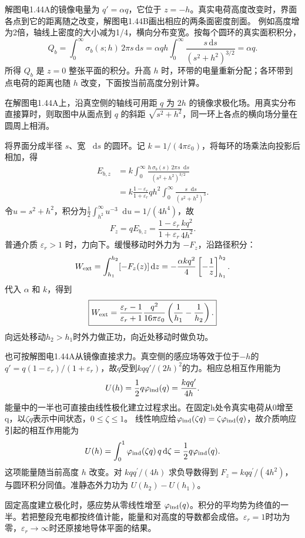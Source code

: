 \documentclass[UTF8,fontset=fandol,a4paper,11pt]{ctexart}
\newcommand{\dd}{\mathop{}\!\mathrm{d}}
\newcommand{\result}[1]{\begin{equation*}\boxed{#1}\end{equation*}}
\begin{document}
解图电1.44A的镜像电量为 $q'=\alpha q$，它位于 $z=-h$。真实电荷高度改变时，界面各点到它的距离随之改变，解图电1.44B画出相应的两条面密度剖面。
例如高度增为2倍，轴线上密度的大小减为1/4，横向分布变宽。按每个圆环的真实面积积分，
\[
Q_b=\int_0^\infty \sigma_b(s;h)\,2\pi s\,\mathrm ds
=\alpha qh\int_0^\infty\frac{s\,\mathrm ds}{(s^2+h^2)^{3/2}}
=\alpha q.
\]
所得 $Q_b$ 是 $z=0$ 整张平面的积分。升高 $h$ 时，环带的电量重新分配；各环带到点电荷的距离也随 $h$ 改变，下面按当前高度分别计算。

在解图电1.44A上，沿真空侧的轴线可用距 $q$ 为 $2h$ 的镜像求极化场。用真实分布直接算时，则取图中从面点到 $q$ 的斜距 $\sqrt{s^2+h^2}$，同一环上各点的横向场分量在圆周上相消。

将界面分成半径 $s$、宽 $\dd s$ 的圆环。记 $k=1/(4\pi\varepsilon_0)$，将每环的场乘法向投影后相加，得
\begin{align*}
E_{b,z}&=k\int_0^\infty\frac{h\,\sigma_b(s)\,2\pi s\dd s}{(s^2+h^2)^{3/2}}\\
&=k\frac{1-\varepsilon_r}{1+\varepsilon_r}qh^2
\int_0^\infty\frac{s\dd s}{(s^2+h^2)^3}.
\end{align*}
令$u=s^2+h^2$，积分为$\frac12\int_{h^2}^\infty u^{-3}\dd u=1/(4h^4)$，故
\[F_z=qE_{b,z}=\frac{1-\varepsilon_r}{1+\varepsilon_r}\frac{kq^2}{4h^2}.
\]
普通介质 $\varepsilon_r>1$ 时，力向下。缓慢移动时外力为 $-F_z$，沿路径积分：
\[
W_{\rm ext}=\int_{h_1}^{h_2}[-F_z(z)]\,\mathrm dz
=-\frac{\alpha kq^2}{4}\left[-\frac{1}{z}\right]_{h_1}^{h_2}.
\]
代入 $\alpha$ 和 $k$，得到
\result{W_{\rm ext}=\frac{\varepsilon_r-1}{\varepsilon_r+1}\frac{q^2}{16\pi\varepsilon_0}
\left(\frac1{h_1}-\frac1{h_2}\right).}
向远处移动$h_2>h_1$时外力做正功，向近处移动时做负功。

也可按解图电1.44A从镜像直接求力。真空侧的感应场等效于位于$-h$的$q'=q(1-\varepsilon_r)/(1+\varepsilon_r)$，故$q$受到$kqq'/(2h)^2$的力。相应总相互作用能为
\[U(h)=\frac12q\varphi_{\rm ind}(q)=\frac{kqq'}{4h}.
\]
能量中的一半也可直接由线性极化建立过程求出。在固定h处令真实电荷从0增至q，以$\zeta q$表示中间状态，$0\le\zeta\le1$。
线性响应给$\varphi_{\rm ind}(\zeta q)=\zeta\varphi_{\rm ind}(q)$，故介质响应引起的相互作用能为
\[
U(h)=\int_0^1\varphi_{\rm ind}(\zeta q)\,q\,\mathrm d\zeta
=\frac12q\varphi_{\rm ind}(q).
\]
这项能量随当前高度 $h$ 改变。对 $kqq^\prime/(4h)$ 求负导数得到 $F_z=kqq^\prime/(4h^2)$，与圆环积分同值。准静态外力功为 $U(h_2)-U(h_1)$。

固定高度建立极化时，感应势从零线性增至 $\varphi_{\rm ind}(q)$。积分的平均势为终值的一半。若把整段充电都按终值计能，能量和对高度的导数都会成倍。$\varepsilon_r=1$时功为零，$\varepsilon_r\to\infty$时还原接地导体平面的结果。
\end{document}
